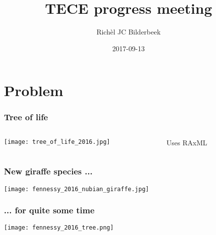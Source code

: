 \documentclass{beamer}
\title[TECE progress meeting]{TECE progress meeting}
\author[RJC Bilderbeek]{Rich\`{e}l JC Bilderbeek}
\institute[University of Groningen]{University of Groningen}
\date[2017-09-13]{2017-09-13}
\begin{document}
\frame{\titlepage}

\section[Problem]{Problem}

\begin{frame}
  \frametitle[]{Tree of life\footnotemark}
  \begin{columns}[T]
    \begin{column}{.45\textwidth}
      \begin{block}{}
        \texttt{[image: tree\_of\_life\_2016.jpg]}
      \end{block}
    \end{column}
    \begin{column}{.5\textwidth}
      \begin{block}{}
        Uses RAxML\footnotemark
      \end{block}
    \end{column}
  \end{columns}
\end{frame}


\begin{frame}
  \frametitle{New giraffe species ... \footnotemark\footnotemark}
  \texttt{[image: fennessy\_2016\_nubian\_giraffe.jpg]}
\end{frame}

\begin{frame}
  \frametitle{... for quite some time\footnotemark}
  \texttt{[image: fennessy\_2016\_tree.png]}
\end{frame}
\end{document}
